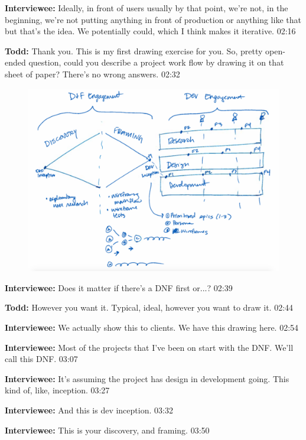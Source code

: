 \textbf{Interviewee:} Ideally, in front of users usually by that point, we're not, in the beginning, we're not putting anything in front of production or anything like that but that's the idea. We potentially could, which I think makes it iterative. 02:16

\textbf{Todd:} Thank you. This is my first drawing exercise for you. So, pretty open-ended question, could you describe a project work flow by drawing it on that sheet of paper? There's no wrong answers. 02:32

\begin{figure}[h]
\centering
\includegraphics[width=6.5in]{interviews/2015_05_29.png}
\caption{}
\label{2015_05_29}
\end{figure}

\textbf{Interviewee:} Does it matter if there's a DNF first or...? 02:39

\textbf{Todd:} However you want it. Typical, ideal, however you want to draw it. 02:44

\textbf{Interviewee:} We actually show this to clients. We have this drawing here. 02:54

\textbf{Interviewee:} Most of the projects that I've been on start with the DNF. We'll call this DNF. 03:07

\textbf{Interviewee:} It's assuming the project has design in development going. This kind of, like, inception. 03:27

\textbf{Interviewee:} And this is dev inception. 03:32

\textbf{Interviewee:} This is your discovery, and framing. 03:50

